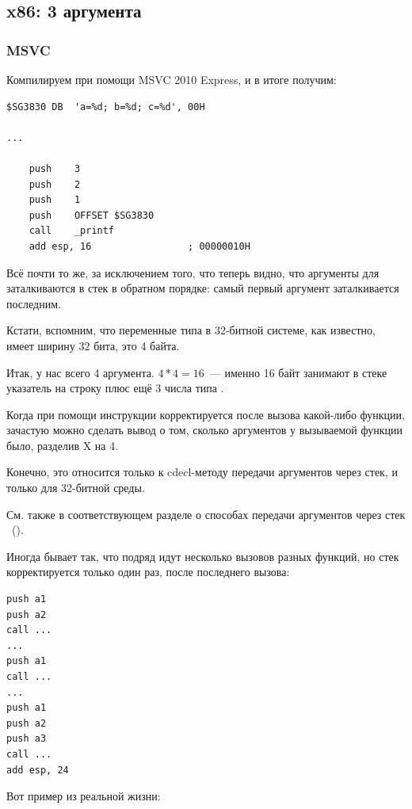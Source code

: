 \subsection{x86: 3 аргумента}

\subsubsection{MSVC}

Компилируем при помощи MSVC 2010 Express, и в итоге получим:

\begin{lstlisting}
$SG3830	DB	'a=%d; b=%d; c=%d', 00H

...

	push	3
	push	2
	push	1
	push	OFFSET $SG3830
	call	_printf
	add	esp, 16					; 00000010H
\end{lstlisting}

Всё почти то же, за исключением того, что теперь видно, что аргументы для \printf заталкиваются в стек в обратном порядке: самый первый аргумент заталкивается последним.

Кстати, вспомним, что переменные типа \Tint в 32-битной системе, как известно, имеет ширину 32 бита, это 4 байта.

Итак, у нас всего 4 аргумента. $4*4 = 16$~--- именно 16 байт занимают в стеке указатель на строку плюс ещё 3 числа типа \Tint.

Когда при помощи инструкции  корректируется  \ESP 
после вызова какой-либо функции, зачастую можно сделать вывод о том, сколько аргументов 
у вызываемой функции было, разделив X на 4.

Конечно, это относится только к cdecl-методу передачи аргументов через стек, и только для 32-битной среды.

См. также в соответствующем разделе о способах передачи аргументов через стек ~().

Иногда бывает так, что подряд идут несколько вызовов разных функций, но стек корректируется только один раз, после последнего вызова:

\begin{lstlisting}
push a1
push a2
call ...
...
push a1
call ...
...
push a1
push a2
push a3
call ...
add esp, 24
\end{lstlisting}

Вот пример из реальной жизни:

